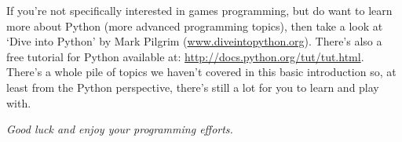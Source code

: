 If you're not specifically interested in games programming, but do want to learn more about Python (more advanced programming topics), then take a look at `Dive into Python' by Mark Pilgrim (\href{http://www.diveintopython.org}{www.diveintopython.org}).  There's also a free tutorial for Python available at: \href{http://docs.python.org/tut/tut.html}{http://docs.python.org/tut/tut.html}.  There's a whole pile of topics we haven't covered in this basic introduction so, at least from the Python perspective, there's still a lot for you to learn and play with.
\par\par\noindent
\emph{Good luck and enjoy your programming efforts.}

\newpage
